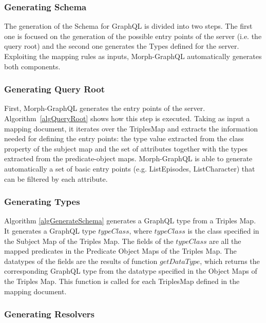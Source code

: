 \subsubsection{Generating Schema}
The generation of the Schema for GraphQL is divided into two steps. The first one is focused on the generation of the possible entry points of the server (i.e. the query root) and the second one generates the Types defined for the server. Exploiting the mapping rules as inputs, Morph-GraphQL automatically generates both components.

\subsubsection{Generating Query Root}
First, Morph-GraphQL generates the entry points of the server. Algorithm~\ref{algQueryRoot} shows how this step is executed. Taking as input a mapping document, it iterates over the TriplesMap and extracts the information needed for defining the entry points: the type value extracted from the class property of the subject map and the set of attributes together with the types extracted from the predicate-object maps. Morph-GraphQL is able to generate automatically a set of basic entry points (e.g. ListEpisodes, ListCharacter) that can be filtered by each attribute.


\subsubsection{Generating Types}
Algorithm \ref{algGenerateSchema} generates a GraphQL type from a Triples Map. It generates a GraphQL type $typeClass$, where $typeClass$ is the class specified in the Subject Map of the Triples Map. The fields of the $typeClass$ are all the mapped predicates in the Predicate Object Maps of the Triples Map. The datatypes of the fields are the results of function $getDataType$, which returns the corresponding GraphQL type from the datatype specified in the Object Maps of the Triples Map. This function is called for each TriplesMap defined in the mapping document.




\subsubsection{Generating Resolvers}
%



